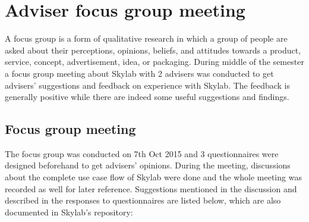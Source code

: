 \chapter{Adviser focus group meeting} \label{focusgroupmeeting}

A focus group is a form of qualitative research in which a group of people are asked about their perceptions, opinions, beliefs, and attitudes towards a product, service, concept, advertisement, idea, or packaging\cite{citationfocusgroup}. During middle of the semester a focus group meeting about Skylab with 2 advisers was conducted to get advisers' suggestions and feedback on experience with Skylab. The feedback is generally positive while there are indeed some useful suggestions and findings.

\section{Focus group meeting}

The focus group was conducted on 7th Oct 2015 and 3 questionnaires were designed beforehand to get advisers' opinions. During the meeting, discussions about the complete use case flow of Skylab were done and the whole meeting was recorded as well for later reference. Suggestions mentioned in the discussion and described in the responses to questionnaires are listed below, which are also documented in Skylab's repository:

